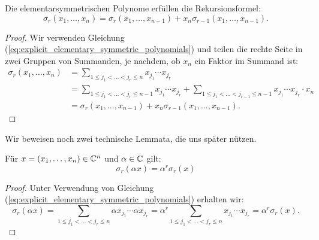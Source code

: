 \begin{lemma}
    \label{lemma:recursion_elementary_symmetric_polynomials}
    Die elementarsymmetrischen Polynome erfüllen die Rekursionsformel:
    \begin{equation}
        \label{eq:recursion_elementary_symmetric_polynomials}
        \sigma_r (x_1, \dots, x_{n}) = \sigma_r (x_1, \dots, x_{n-1}) + x_{n} \sigma_{r-1} (x_1, \dots, x_{n-1}).
    \end{equation}
\end{lemma}
\begin{proof}
    Wir verwenden Gleichung (\ref{eq:explicit_elementary_symmetric_polynomials})
    und teilen die rechte Seite in zwei Gruppen von Summanden, je nachdem, ob
    $x_n$ ein Faktor im Summand ist:
    \begin{equation*}
        \begin{split}
            \sigma_r (x_1, \dots, x_{n})
            &= \sum_{1 \leq j_1 < \dots < j_r \leq n} x_{j_1} \cdots x_{j_r}\\
            &= \sum_{1 \leq j_1 < \dots < j_r \leq n-1} x_{j_1} \cdots x_{j_r}
            + \sum_{1 \leq j_1 < \dots < j_{r-1} \leq n-1} x_{j_1} \cdots x_{j_r} \cdot x_{n}\\
            &= \sigma_r (x_1, \dots, x_{n-1}) + x_{n} \sigma_{r-1} (x_1, \dots, x_{n-1}).
        \end{split}
    \end{equation*}
\end{proof}

\noindent Wir beweisen noch zwei technische Lemmata, die uns später nützen.

\begin{lemma}
    \label{lemma:elementary_symmetric_polynomials_const_multiplication}
    Für $x = (x_1, \dots, x_n) \in \mathbb{C}^n$ und $\alpha \in \mathbb{C}$ gilt:
    \begin{equation}
        \label{eq:elementary_symmetric_polynomials_const_multiplication}
        \sigma_{r}(\alpha x)
        = \alpha^{r} \sigma_{r}(x)
    \end{equation}
\end{lemma}
\begin{proof}
    Unter Verwendung von Gleichung
    (\ref{eq:explicit_elementary_symmetric_polynomials})
    erhalten wir:
    \[
        \sigma_{r}(\alpha x)
        = \sum_{1 \leq j_1 < \dots < j_r \leq n} \alpha x_{j_1} \cdots \alpha x_{j_r}
        = \alpha^r \sum_{1 \leq j_1 < \dots < j_r \leq n} x_{j_1} \cdots x_{j_r}
        = \alpha^r \sigma_{r}(x).
    \]
\end{proof}

